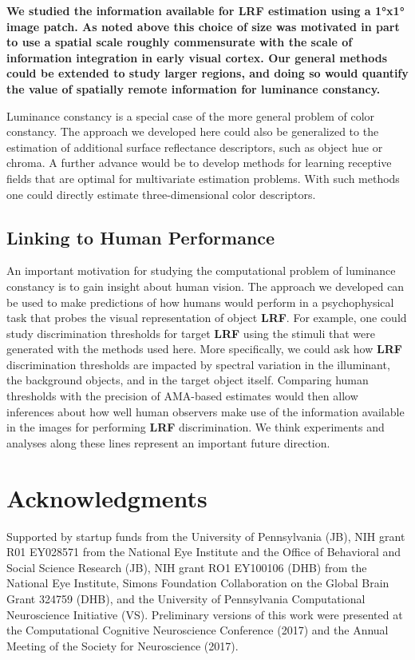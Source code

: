 \documentclass{jov}
\providecommand{\DIFaddtex}[1]{{\bf #1}} %
\providecommand{\DIFdeltex}[1]{} %
\providecommand{\DIFaddbegin}{} %
\providecommand{\DIFaddend}{} %
\providecommand{\DIFdelbegin}{} %
\providecommand{\DIFdelend}{} %
\providecommand{\DIFadd}[1]{\texorpdfstring{\DIFaddtex{#1}}{#1}} %
\providecommand{\DIFdel}[1]{\texorpdfstring{\DIFdeltex{#1}}{}} %
\newcommand{\DIFscaledelfig}{0.5}
\newlength{\DIFdelgraphicswidth} %
\newlength{\DIFdelgraphicsheight} %
\newcommand{\DIFaddincludegraphics}[2][]{{\color{blue}\fbox{\DIFOincludegraphics[#1]{#2}}}} %
\newcommand{\DIFdelincludegraphics}[2][]{%
\sbox{\DIFdelgraphicsbox}{\DIFOincludegraphics[#1]{#2}}%
\settoboxwidth{\DIFdelgraphicswidth}{\DIFdelgraphicsbox} %
\settoboxtotalheight{\DIFdelgraphicsheight}{\DIFdelgraphicsbox} %
\scalebox{\DIFscaledelfig}{%
\parbox[b]{\DIFdelgraphicswidth}{\usebox{\DIFdelgraphicsbox}\\[-\baselineskip] \rule{\DIFdelgraphicswidth}{0em}}\llap{\resizebox{\DIFdelgraphicswidth}{\DIFdelgraphicsheight}{%
\setlength{\unitlength}{\DIFdelgraphicswidth}%
\begin{picture}(1,1)%
\thicklines\linethickness{2pt} %
{\color[rgb]{1,0,0}\put(0,0){\framebox(1,1){}}}%
{\color[rgb]{1,0,0}\put(0,0){\line( 1,1){1}}}%
{\color[rgb]{1,0,0}\put(0,1){\line(1,-1){1}}}%
\end{picture}%
}\hspace*{3pt}}} %
} %
\DeclareRobustCommand{\DIFaddbegin}{\DIFOaddbegin \let\includegraphics\DIFaddincludegraphics} %
\DeclareRobustCommand{\DIFaddend}{\DIFOaddend \let\includegraphics\DIFOincludegraphics} %
\DeclareRobustCommand{\DIFdelbegin}{\DIFOdelbegin \let\includegraphics\DIFdelincludegraphics} %
\DeclareRobustCommand{\DIFdelend}{\DIFOaddend \let\includegraphics\DIFOincludegraphics} %
\begin{document}
\DIFaddbegin \DIFadd{We studied the information available for LRF estimation using a 1°x1° image patch. As noted above this choice of size was motivated in part to use a spatial scale roughly commensurate with the scale of information integration in early visual cortex. Our general methods could be extended to study larger regions, and doing so would quantify the value of spatially remote information for luminance constancy. 
}

\DIFaddend Luminance constancy is a special case of the more general problem of color constancy.
The approach we developed here could also be generalized to the estimation of additional surface reflectance descriptors, such as object hue or chroma.
A further advance would be to develop methods for learning receptive fields that are optimal for multivariate estimation problems. 
With such methods one could directly estimate three-dimensional color descriptors.

\subsection{Linking to Human Performance}

An important motivation for studying the computational problem of luminance constancy is to gain insight about human vision.
The approach we developed can be used to make predictions of how humans would perform in a psychophysical task that probes the visual representation of object \DIFdelbegin \DIFdel{LRV}\DIFdelend \DIFaddbegin \DIFadd{LRF}\DIFaddend .
For example, one could study discrimination thresholds for target \DIFdelbegin \DIFdel{LRV }\DIFdelend \DIFaddbegin \DIFadd{LRF }\DIFaddend using the stimuli that were generated with the methods used here.
More specifically, we could ask how \DIFdelbegin \DIFdel{LRV }\DIFdelend \DIFaddbegin \DIFadd{LRF }\DIFaddend discrimination thresholds are impacted by spectral variation in the illuminant, the background objects, and in the target object itself.
Comparing human thresholds with the precision of AMA-based estimates would then allow inferences about how well human observers make use of the information available in the images for performing \DIFdelbegin \DIFdel{LRV }\DIFdelend \DIFaddbegin \DIFadd{LRF }\DIFaddend discrimination.
We think experiments and analyses along these lines represent an important future direction.

\section{Acknowledgments} \label{Acknowledgments}

Supported by startup funds from the University of Pennsylvania (JB), NIH grant R01 EY028571 from the National Eye Institute and the Office of Behavioral and Social Science Research (JB), NIH grant RO1 EY100106 (DHB) from the National Eye Institute, Simons Foundation Collaboration on the Global Brain Grant 324759 (DHB), and the University of Pennsylvania Computational Neuroscience Initiative (VS).  Preliminary versions of this work were presented at the Computational Cognitive Neuroscience Conference (2017) and the Annual Meeting of the Society for Neuroscience (2017).



\end{document}
